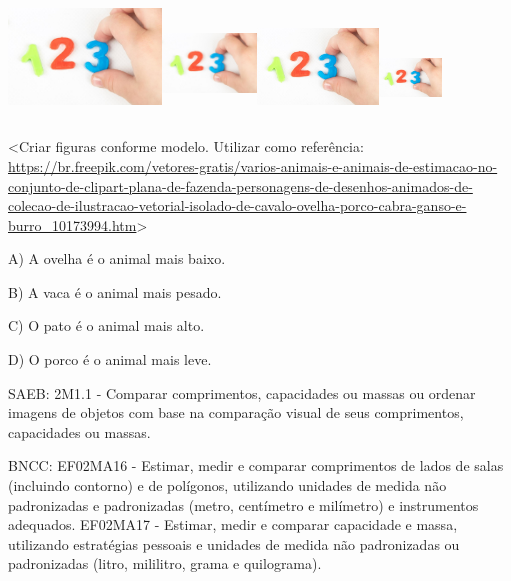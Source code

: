 \includegraphics[width=1.60383in,height=1.29919in]{media/image114.png}\includegraphics[width=0.99316in,height=1.17006in]{media/image114.png}\includegraphics[width=1.27263in,height=1.09078in]{media/image114.png}\includegraphics[width=0.65433in,height=0.85550in]{media/image114.png}

\textless{}Criar figuras conforme modelo. Utilizar como referência:
\url{https://br.freepik.com/vetores-gratis/varios-animais-e-animais-de-estimacao-no-conjunto-de-clipart-plana-de-fazenda-personagens-de-desenhos-animados-de-colecao-de-ilustracao-vetorial-isolado-de-cavalo-ovelha-porco-cabra-ganso-e-burro_10173994.htm}\textgreater{}

A) A ovelha é o animal mais baixo.

B) A vaca é o animal mais pesado.

C) O pato é o animal mais alto.

D) O porco é o animal mais leve.

SAEB: 2M1.1 - Comparar comprimentos, capacidades ou massas ou ordenar
imagens de objetos com base na comparação visual de seus comprimentos,
capacidades ou massas.

BNCC: EF02MA16 - Estimar, medir e comparar comprimentos de lados de
salas (incluindo contorno) e de polígonos, utilizando unidades de medida
não padronizadas e padronizadas (metro, centímetro e milímetro) e
instrumentos adequados. EF02MA17 - Estimar, medir e comparar capacidade
e massa, utilizando estratégias pessoais e unidades de medida não
padronizadas ou padronizadas (litro, mililitro, grama e quilograma).

